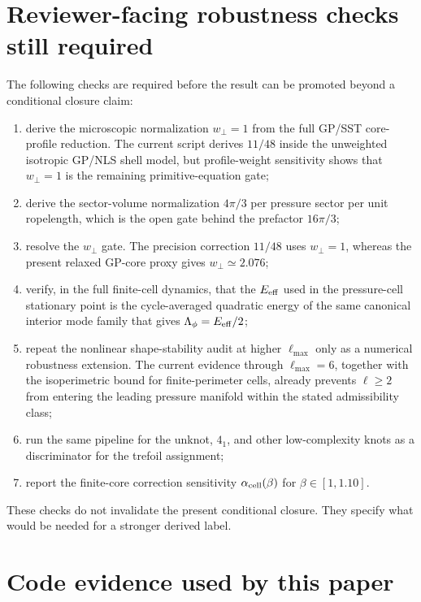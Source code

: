 \documentclass[11pt]{article}
\begin{document}
\section{Reviewer-facing robustness checks still required}
\label{sec:reviewer-checks}

The following checks are required before the result can be promoted beyond a
conditional closure claim:
\begin{enumerate}
\item derive the microscopic normalization \(w_\perp=1\) from the full GP/SST
core-profile reduction.  The current script derives \(11/48\) inside the
unweighted isotropic GP/NLS shell model, but profile-weight sensitivity shows
that \(w_\perp=1\) is the remaining primitive-equation gate;
\item derive the sector-volume normalization \(4\pi/3\) per pressure sector
per unit ropelength, which is the open gate behind the prefactor \(16\pi/3\);
\item resolve the \(w_\perp\) gate.  The precision correction \(11/48\) uses
\(w_\perp=1\), whereas the present relaxed GP-core proxy gives
\(w_\perp\simeq2.076\);
\item verify, in the full finite-cell dynamics, that the \(E_{\rm eff}\) used
in the pressure-cell stationary point is the cycle-averaged quadratic energy of
the same canonical interior mode family that gives
\(\Lambda_\phi=E_{\rm eff}/2\);
\item repeat the nonlinear shape-stability audit at higher \(\ell_{\max}\) only as a numerical robustness extension.  The current evidence through \(\ell_{\max}=6\), together with the isoperimetric bound for finite-perimeter cells, already prevents \(\ell\ge2\) from entering the leading pressure manifold within the stated admissibility class;
\item run the same pipeline for the unknot, \(4_1\), and other low-complexity
knots as a discriminator for the trefoil assignment;
\item report the finite-core correction sensitivity
\(\alpha_{\rm cell}(\beta)\) for \(\beta\in[1,1.10]\).
\end{enumerate}
These checks do not invalidate the present conditional closure.  They specify
what would be needed for a stronger derived label.


\section{Code evidence used by this paper}
\label{sec:paper3-code-evidence}
\end{document}
